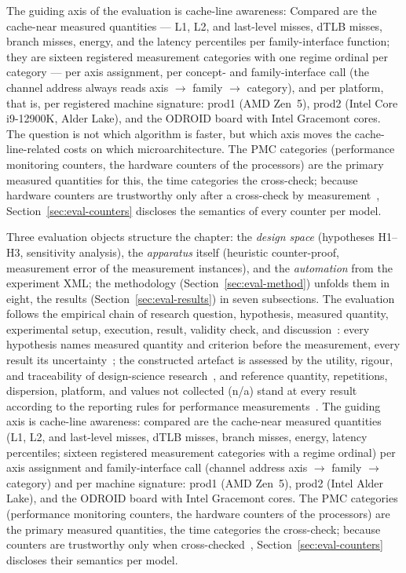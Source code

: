 \begin{nurlang}
The guiding axis of the evaluation is cache-line awareness: Compared are the cache-near measured
quantities --- L1, L2, and last-level misses, dTLB misses, branch misses, energy, and the latency
percentiles per family-interface function; they are sixteen registered measurement categories with one
regime ordinal per category --- per axis assignment, per concept- and family-interface call (the channel
address always reads axis $\to$ family $\to$ category), and per platform, that is, per registered machine
signature: prod1 (AMD Zen~5), prod2 (Intel Core i9-12900K, Alder Lake), and the ODROID board with Intel
Gracemont cores. The question is not which algorithm is faster, but which axis moves the
cache-line-related costs on which microarchitecture. The PMC categories (performance monitoring
counters, the hardware counters of the processors) are the primary measured quantities for this, the
time categories the cross-check; because hardware counters are trustworthy only after a cross-check by
measurement~\cite{weaver2008counters}, Section~\ref{sec:eval-counters} discloses the semantics of every
counter per model.
\end{nurlang}
\begin{nurkurz}
Three evaluation objects structure the chapter: the \emph{design space} (hypotheses H1--H3, sensitivity
analysis), the \emph{apparatus} itself (heuristic counter-proof, measurement error of the measurement
instances), and the \emph{automation} from the experiment XML\@; the methodology
(Section~\ref{sec:eval-method}) unfolds them in eight, the results (Section~\ref{sec:eval-results}) in seven
subsections. The evaluation follows the empirical chain of research question, hypothesis, measured quantity,
experimental setup, execution, result, validity check, and
discussion~\cite{wohlin2012experimentation,shaw2003writing}: every hypothesis names measured quantity and
criterion before the measurement, every result its
uncertainty~\cite{georges2007rigorous,kalibera2013rigorous}; the constructed artefact is assessed by the
utility, rigour, and traceability of design-science
research~\cite{hevner2004designscience,peffers2007dsrm,wieringa2014designscience}, and reference quantity,
repetitions, dispersion, platform, and values not collected (n/a) stand at every result according to the
reporting rules for performance measurements~\cite{hoefler2015benchmarking,blackburn2016truth}. The guiding
axis is cache-line awareness: compared are the cache-near measured quantities (L1, L2, and last-level misses,
dTLB misses, branch misses, energy, latency percentiles; sixteen registered measurement categories with a
regime ordinal) per axis assignment and family-interface call (channel address axis $\to$ family $\to$
category) and per machine signature: prod1 (AMD Zen~5), prod2 (Intel Alder Lake), and the ODROID board with
Intel Gracemont cores. The PMC categories (performance monitoring counters, the hardware counters of the
processors) are the primary measured quantities, the time categories the cross-check; because counters are
trustworthy only when cross-checked~\cite{weaver2008counters}, Section~\ref{sec:eval-counters} discloses
their semantics per model.
\end{nurkurz}

